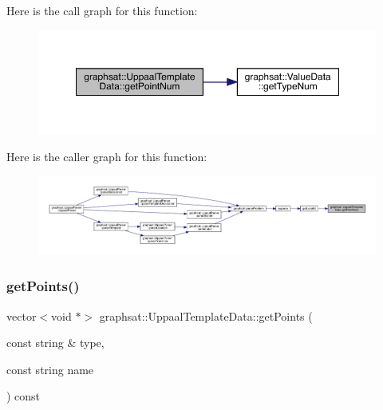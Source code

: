 Here is the call graph for this function\+:
\nopagebreak
\begin{figure}[H]
\begin{center}
\leavevmode
\includegraphics[width=350pt]{classgraphsat_1_1_uppaal_template_data_aeaaf6edf94a9f282e78c25faac74b63e_cgraph}
\end{center}
\end{figure}
Here is the caller graph for this function\+:
\nopagebreak
\begin{figure}[H]
\begin{center}
\leavevmode
\includegraphics[width=350pt]{classgraphsat_1_1_uppaal_template_data_aeaaf6edf94a9f282e78c25faac74b63e_icgraph}
\end{center}
\end{figure}
\mbox{\label{classgraphsat_1_1_uppaal_template_data_a2292204622aa329e9e65aafb7f628f3c}} 
\subsubsection{\texorpdfstring{getPoints()}{getPoints()}\hspace{0.1cm}{\footnotesize\ttfamily [1/2]}}
{\footnotesize\ttfamily vector$<$void $\ast$$>$ graphsat\+::\+Uppaal\+Template\+Data\+::get\+Points (\begin{DoxyParamCaption}\item[{const string \&}]{type,  }\item[{const string}]{name }\end{DoxyParamCaption}) const\hspace{0.3cm}{\ttfamily [inline]}}

